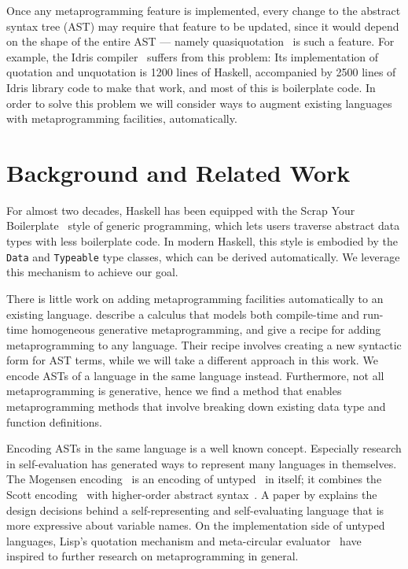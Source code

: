 \documentclass[format=acmsmall, review=false, screen=true]{acmart}
\newcommand{\CodeType}[1]{\textcolor{CodeBlue}{#1}}
\newcommand{\ty}[1]{\CodeType{\texttt{#1}}}
\begin{document}
Once any metaprogramming feature is implemented, every change to the abstract syntax tree (AST) may require that feature to be updated, since it would depend on the shape of the entire AST --- namely quasiquotation~\cite{idrisQuotation} is such a feature.
For example, the Idris compiler~\cite{idris} suffers from this problem: Its implementation of quotation and unquotation is 1200 lines of Haskell, accompanied by 2500 lines of Idris library code to make that work, and most of this is boilerplate code. In order to solve this problem we will consider ways to augment existing languages with metaprogramming facilities, automatically.

\section{Background and Related Work}

For almost two decades, Haskell has been equipped with the Scrap Your
Boilerplate~\cite{syb,sybc} style of generic programming, which lets users traverse
abstract data types with less boilerplate code.
In modern Haskell, this style is embodied by the \ty{Data} and \ty{Typeable}
type classes, which can be derived automatically.
We leverage this mechanism to achieve our goal.

There is little work on adding metaprogramming facilities automatically to an existing language.
\citet{hgmp} describe a calculus that models both compile-time and run-time homogeneous generative metaprogramming, and give a recipe for adding metaprogramming to any language.
Their recipe involves creating a new syntactic form for AST terms, while we
will take a different approach in this work.
We encode ASTs of a language in the same language instead.
Furthermore, not all metaprogramming is generative, hence we find a method that enables metaprogramming methods that involve breaking down existing data type and function definitions.

Encoding ASTs in the same language is a well known concept.
Especially research in self-evaluation has generated ways to represent many
languages in themselves.  The Mogensen encoding~\cite{mogensen} is an encoding
of untyped \lc\ in itself; it combines the Scott encoding~\cite{scott} with
higher-order abstract syntax~\cite{hoas}.
A paper by \citet{stump2009directly} explains the design decisions behind a
self-representing and self-evaluating language that is more expressive about
variable names.  On the implementation side of untyped languages, Lisp's
quotation mechanism and meta-circular evaluator~\cite{mccarthy1965lisp}
have inspired to further research on metaprogramming in general.
\end{document}
